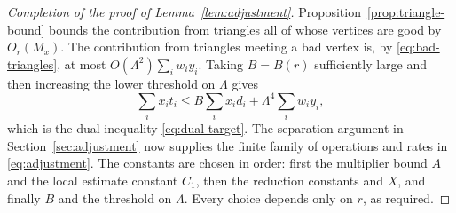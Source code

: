 \begin{proof}[Completion of the proof of Lemma~\ref{lem:adjustment}]
Proposition~\ref{prop:triangle-bound} bounds the contribution from
triangles all of whose vertices are good by $O_r(M_x)$.  The contribution
from triangles meeting a bad vertex is, by \eqref{eq:bad-triangles}, at
most $O(\Lambda^2)\sum_iw_iy_i$.  Taking $B=B(r)$ sufficiently large
and then increasing the lower threshold on $\Lambda$ gives
\[
 \sum_i x_it_i\le B\sum_i x_id_i+\Lambda^4\sum_iw_iy_i,
\]
which is the dual inequality \eqref{eq:dual-target}.  The separation
argument in Section~\ref{sec:adjustment} now supplies the finite family
of operations and rates in \eqref{eq:adjustment}.  The constants are
chosen in order: first the multiplier bound $A$ and the local estimate
constant $C_1$, then the reduction constants and $X$, and finally $B$
and the threshold on $\Lambda$.  Every choice depends only on $r$, as
required.
\end{proof}

